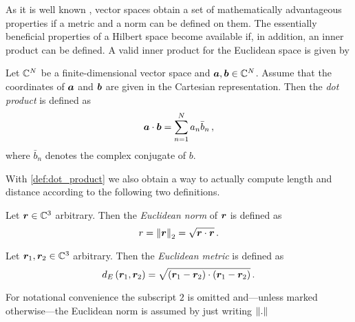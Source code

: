 As it is well known \cite{heuser2006}, vector spaces obtain a set of
mathematically advantageous properties if a metric and a norm can be defined on
them.
The essentially beneficial properties of a Hilbert space become available if,
in addition, an inner product can be defined.
A valid inner product for the Euclidean space is given by
\begin{definition}\label{def:dot_product}
	Let $\mathbb{C}^N$ be a finite-dimensional vector space and
	$\pvec{a}, \pvec{b} \in \C^N$.
	Assume that the coordinates of $\pvec{a}$ and $\pvec{b}$ are given in
	the Cartesian representation.
	Then the \emph{dot product}
	is defined as 
	\begin{equation}
		\pvec{a} \cdot \pvec{b} = \sum\limits_{n = 1}^{N} a_n \bar{b}_n \, ,
	\end{equation}
	where $\bar{b}_n$ denotes the complex conjugate of $b$.
\end{definition}

With \cref{def:dot_product} we also obtain a way to actually compute length
and distance according to the following two definitions.

\begin{definition}\label{def:euclidean_norm}
	Let $\pvec{r} \in \C^3$ arbitrary. Then the \emph{Euclidean norm} of
	$\pvec{r}$ is defined as
	\begin{equation}
		r = \euclideanNorm{\pvec{r}} = \sqrt{\pvec{r} \cdot \pvec{r}} \, .
	\end{equation}
\end{definition}

\begin{definition}\label{def:euclidean_metric}
	Let $\pvec{r}_1, \pvec{r}_2 \in \C^3$ arbitrary. Then the \emph{Euclidean
	metric} is defined as
	\begin{equation}
		d_E\left(\pvec{r}_1 , \pvec{r}_2\right) = 
		\sqrt{
			\left(\pvec{r}_1 - \pvec{r}_2\right)
			\cdot
			\left(\pvec{r}_1 - \pvec{r}_2\right)
		} \, .
	\end{equation}
\end{definition}

\begin{remark}
	For notational convenience the subscript $2$ is omitted and---unless
	marked otherwise---the Euclidean norm is assumed by just writing $\left\Vert . \right\Vert$
\end{remark}







